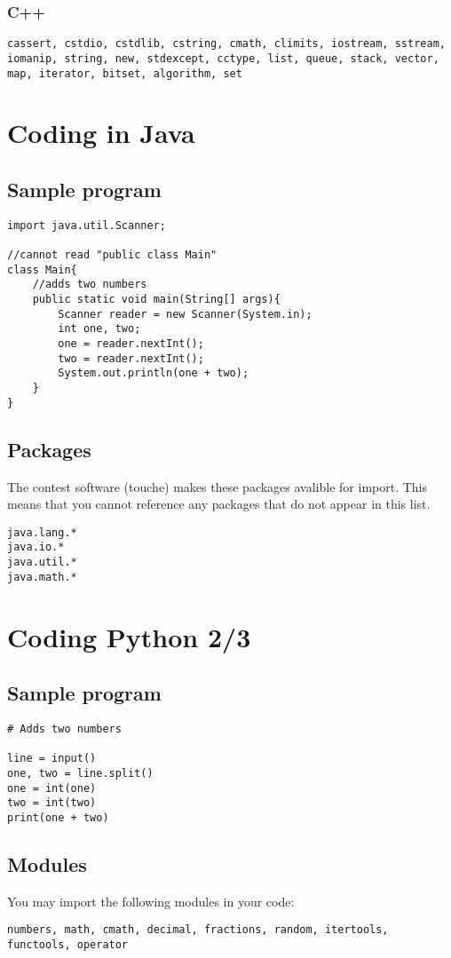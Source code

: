 \documentclass{article}
\begin{document}
	\subsubsection{C++}
	\begin{lstlisting}
cassert, cstdio, cstdlib, cstring, cmath, climits, iostream, sstream, iomanip, string, new, stdexcept, cctype, list, queue, stack, vector, map, iterator, bitset, algorithm, set
	\end{lstlisting}
	
	\section{Coding in Java}
	\subsection{Sample program}
	\lstset{language=java}
	\begin{lstlisting}
import java.util.Scanner;

//cannot read "public class Main"
class Main{ 
	//adds two numbers
	public static void main(String[] args){
		Scanner reader = new Scanner(System.in); 
		int one, two;
		one = reader.nextInt();
		two = reader.nextInt();
		System.out.println(one + two);
	}
}
	\end{lstlisting}
	
	\subsection{Packages}
	The contest software (touche) makes these packages avalible for import. 
	This means that you cannot reference any packages that do not appear in this list.

	\begin{lstlisting}
java.lang.*
java.io.*
java.util.*
java.math.*
	\end{lstlisting}
	
	\section{Coding Python 2/3}
	\subsection{Sample program}
	\lstset{language=Python}
	\begin{lstlisting}
# Adds two numbers

line = input()
one, two = line.split()
one = int(one)
two = int(two)
print(one + two)
	\end{lstlisting}
	
	\subsection{Modules}
	You may import the following modules in your code:
	\begin{lstlisting}
numbers, math, cmath, decimal, fractions, random, itertools, functools, operator
	\end{lstlisting}
\end{document}
